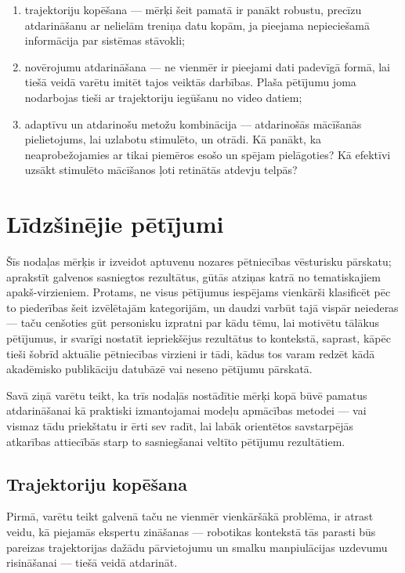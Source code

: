 \documentclass[12pt, a4paper]{article}
\numberwithin{equation}{section} %
\begin{document}
\begin{enumerate}
    \item trajektoriju kopēšana --- mērķi šeit pamatā ir panākt robustu, precīzu atdarināšanu ar nelielām treniņa datu kopām, ja pieejama nepieciešamā informācija par sistēmas stāvokli;
    \item novērojumu atdarināšana --- ne vienmēr ir pieejami dati padevīgā formā, lai tiešā veidā varētu imitēt tajos veiktās darbības. Plaša pētījumu joma nodarbojas tieši ar trajektoriju iegūšanu no video datiem;
    \item adaptīvu un atdarinošu metožu kombinācija --- atdarinošās mācīšanās pielietojums, lai uzlabotu stimulēto, un otrādi. Kā panākt, ka neaprobežojamies ar tikai piemēros esošo un spējam pielāgoties? Kā efektīvi uzsākt stimulēto mācīšanos ļoti retinātās atdevju telpās?
\end{enumerate}

\newpage
\section{Līdzšinējie pētījumi}

Šīs nodaļas mērķis ir izveidot aptuvenu nozares pētniecības vēsturisku pārskatu; aprakstīt galvenos sasniegtos rezultātus, gūtās atziņas katrā no tematiskajiem apakš-virzieniem. Protams, ne visus pētījumus iespējams vienkārši klasificēt pēc to piederības šeit izvēlētajām kategorijām, un daudzi varbūt tajā vispār neiederas --- taču cenšoties gūt personisku izpratni par kādu tēmu, lai motivētu tālākus pētījumus, ir svarīgi nostatīt iepriekšējus rezultātus to kontekstā, saprast, kāpēc tieši šobrīd aktuālie pētniecības virzieni ir tādi, kādus tos varam redzēt kādā akadēmisko publikāciju datubāzē vai neseno pētījumu pārskatā.

Savā ziņā varētu teikt, ka trīs nodaļās nostādītie mērķi kopā būvē pamatus atdarināšanai kā praktiski izmantojamai modeļu apmācības metodei --- vai vismaz tādu priekštatu ir ērti sev radīt, lai labāk orientētos savstarpējās atkarības attiecībās starp to sasniegšanai veltīto pētījumu rezultātiem.

\subsection{Trajektoriju kopēšana}

Pirmā, varētu teikt galvenā taču ne vienmēr vienkāršākā problēma, ir atrast veidu, kā piejamās ekspertu zināšanas --- robotikas kontekstā tās parasti būs pareizas trajektorijas dažādu pārvietojumu un smalku manpiulācijas uzdevumu risināšanai --- tiešā veidā atdarināt.
\end{document}
